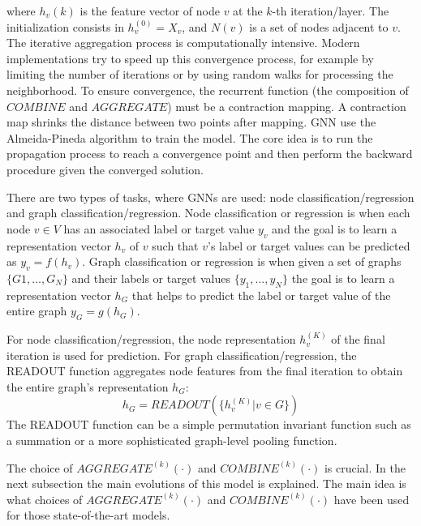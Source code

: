 where $h_v(k)$ is the feature vector of node $v$ at the $k$-th iteration/layer. The initialization consists in $h_v^{(0)} = X_v$, and $N(v)$ is a set of nodes adjacent to $v$. 
The iterative aggregation process is computationally intensive. Modern implementations try to speed up this convergence process, for example by limiting the number of iterations or by using random walks for processing the neighborhood.  To ensure convergence, the recurrent function (the composition of $COMBINE$ and $AGGREGATE$) must be a contraction mapping. A contraction map shrinks the distance between two points after mapping. GNN use the Almeida-Pineda algorithm \cite{AlmeidaPineda} to train the model. The core idea is to run the propagation process to reach a convergence point and then perform the backward procedure given the converged solution.

There are two types of tasks, where GNNs are used: node classification/regression and graph classification/regression.  Node classification or regression is when each node $v \in V$ has an associated label or target value $y_v$ and the goal is to learn a representation vector $h_v$ of $v$ such that $v$'s label or target values can be predicted as $y_v=f(h_v)$. Graph classification or regression is when given a set of graphs $\{ G1, ..., G_N\}$ and their labels or target values $\{y_1,...,y_N\}$ the goal is to learn a representation vector $h_G$ that helps to predict the label or target value of the entire graph $y_G=g(h_G)$.

For node classification/regression, the node representation $h_v^{(K)}$ of the final iteration is used for prediction. For graph classification/regression, the READOUT function aggregates node features from the final iteration to obtain the entire graph's representation $h_G$:
$$h_G = READOUT(\{h_v^{(K)} | v \in G\})$$
The READOUT function can be a simple permutation invariant function such as a summation or a more sophisticated graph-level pooling function.

The choice of $AGGREGATE^{(k)}(\cdot)$ and $COMBINE^{(k)}(\cdot)$ is crucial. In the next subsection the main evolutions of this model is explained. The main idea is what choices of $AGGREGATE^{(k)}(\cdot)$ and $COMBINE^{(k)}(\cdot)$  have been used for those state-of-the-art models. 


